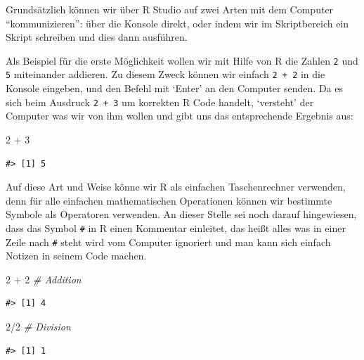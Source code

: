 \documentclass[]{tufte-book}
\newenvironment{Shaded}{}{}
\newcommand{\DecValTok}[1]{\textcolor[rgb]{0.25,0.63,0.44}{#1}}
\newcommand{\StringTok}[1]{\textcolor[rgb]{0.25,0.44,0.63}{#1}}
\newcommand{\CommentTok}[1]{\textcolor[rgb]{0.38,0.63,0.69}{\textit{#1}}}
\newcommand{\OperatorTok}[1]{\textcolor[rgb]{0.40,0.40,0.40}{#1}}
\begin{document}
Grundsätzlich können wir über R Studio auf zwei Arten mit dem Computer
``kommunizieren'': über die Konsole direkt, oder indem wir im
Skriptbereich ein Skript schreiben und dies dann ausführen.

Als Beispiel für die erste Möglichkeit wollen wir mit Hilfe von R die
Zahlen \texttt{2} und \texttt{5} miteinander addieren. Zu diesem Zweck
können wir einfach \texttt{2\ +\ 2} in die Konsole eingeben, und den
Befehl mit `Enter' an den Computer senden. Da es sich beim Ausdruck
\texttt{2\ +\ 3} um korrekten R Code handelt, `versteht' der Computer
was wir von ihm wollen und gibt uns das entsprechende Ergebnis aus:

\begin{Shaded}
\begin{Highlighting}[]
\DecValTok{2} \OperatorTok{+}\StringTok{ }\DecValTok{3}
\end{Highlighting}
\end{Shaded}

\begin{verbatim}
#> [1] 5
\end{verbatim}

Auf diese Art und Weise könne wir R als einfachen Taschenrechner
verwenden, denn für alle einfachen mathematischen Operationen können wir
bestimmte Symbole als Operatoren verwenden. An dieser Stelle sei noch
darauf hingewiesen, dass das Symbol \texttt{\#} in R einen Kommentar
einleitet, das heißt alles was in einer Zeile nach \texttt{\#} steht
wird vom Computer ignoriert und man kann sich einfach Notizen in seinem
Code machen.

\begin{Shaded}
\begin{Highlighting}[]
\DecValTok{2} \OperatorTok{+}\StringTok{ }\DecValTok{2}  \CommentTok{# Addition}
\end{Highlighting}
\end{Shaded}

\begin{verbatim}
#> [1] 4
\end{verbatim}

\begin{Shaded}
\begin{Highlighting}[]
\DecValTok{2}\OperatorTok{/}\DecValTok{2}  \CommentTok{# Division}
\end{Highlighting}
\end{Shaded}

\begin{verbatim}
#> [1] 1
\end{verbatim}
\end{document}
